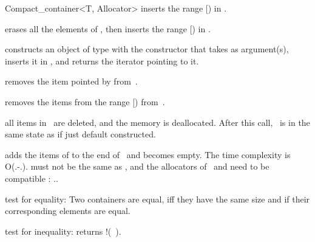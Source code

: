 \begin{ccRefClass}{Compact_container<T, Allocator>}
  {inserts the range [) in \ccVar.}

  {erases all the elements of \ccVar, then inserts the range
   [) in \ccVar.}

  {constructs an object of type  with the constructor that takes
    as argument(s), inserts it in \ccVar, and returns the iterator pointing
   to it.}


  {removes the item pointed by  from~\ccVar.}

  {removes the items from the range [) from~\ccVar.}

  {all items in \ccVar\ are deleted, and the memory is deallocated.
   After this call, \ccVar\ is in the same state as if just default
   constructed.}



  {adds the items of  to the end of \ccVar\ and  becomes empty.
   The time complexity is O(\ccVar.-\ccVar.).
   \ccPrecond {} must not be the same as \ccVar,
   and the allocators of \ccVar\ and  need to be compatible :
   \ccVar..}


  {test for equality: Two containers are equal, iff they have the
   same size and if their corresponding elements are equal.}

  {test for inequality: returns !(\ccVar\ ).}


\end{ccRefClass}
